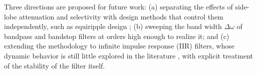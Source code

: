 \documentclass[journal]{IEEEtran}
\begin{document}
Three directions are proposed for future work: (a) separating the effects of
side-lobe attenuation and selectivity with design methods that control them
independently, such as equiripple design \cite{Oppenheim2009}; (b) sweeping the
band width $\Delta\omega$ of bandpass and bandstop filters at orders high enough
to realize it; and (c) extending the methodology to infinite impulse response
(IIR) filters, whose dynamic behavior is still little explored in the
literature \cite{Borges2024sbrt}, with explicit treatment of the stability of
the filter itself.



\end{document}
